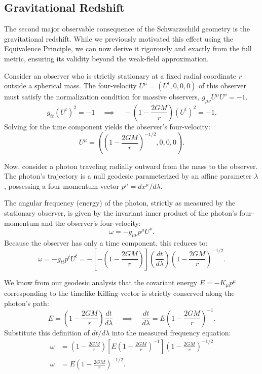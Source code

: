 \documentclass[11pt, a4paper]{report}
\begin{document}
\subsection{Gravitational Redshift}

The second major observable consequence of the Schwarzschild geometry is the gravitational redshift. While we previously motivated this effect using the Equivalence Principle, we can now derive it rigorously and exactly from the full metric, ensuring its validity beyond the weak-field approximation.

Consider an observer who is strictly stationary at a fixed radial coordinate $r$ outside a spherical mass. The four-velocity $U^{\mu} = (U^{t}, 0, 0, 0)$ of this observer must satisfy the normalization condition for massive observers, $g_{\mu\nu}U^{\mu}U^{\nu} = -1$.
\begin{equation}
g_{tt}(U^{t})^{2} = -1 \quad \implies \quad -\left(1-\frac{2GM}{r}\right)(U^{t})^{2} = -1.
\end{equation}
Solving for the time component yields the observer's four-velocity:
\begin{equation}
U^{\mu} = \left( \left(1-\frac{2GM}{r}\right)^{-1/2}, 0, 0, 0 \right).
\end{equation}

Now, consider a photon traveling radially outward from the mass to the observer. The photon's trajectory is a null geodesic parameterized by an affine parameter $\lambda$, possessing a four-momentum vector $p^{\mu} = dx^{\mu}/d\lambda$. 

The angular frequency (energy) of the photon, strictly as measured by the stationary observer, is given by the invariant inner product of the photon's four-momentum and the observer's four-velocity:
\begin{equation}
\omega = -g_{\mu\nu}p^{\mu}U^{\nu}.
\end{equation}
Because the observer has only a time component, this reduces to:
\begin{equation}
\omega = -g_{tt} p^{t} U^{t} = -\left[ -\left(1-\frac{2GM}{r}\right) \right] \left( \frac{dt}{d\lambda} \right) \left(1-\frac{2GM}{r}\right)^{-1/2}.
\end{equation}

We know from our geodesic analysis that the covariant energy $E = -K_{\mu}p^{\mu}$ corresponding to the timelike Killing vector is strictly conserved along the photon's path:
\begin{equation}
E = \left(1-\frac{2GM}{r}\right)\frac{dt}{d\lambda} \quad \implies \quad \frac{dt}{d\lambda} = E \left(1-\frac{2GM}{r}\right)^{-1}.
\end{equation}
Substitute this definition of $dt/d\lambda$ into the measured frequency equation:
\begin{align}
\omega &= \left(1-\frac{2GM}{r}\right) \left[ E \left(1-\frac{2GM}{r}\right)^{-1} \right] \left(1-\frac{2GM}{r}\right)^{-1/2} \nonumber \\
\omega &= E \left(1-\frac{2GM}{r}\right)^{-1/2}.
\end{align}
\end{document}

